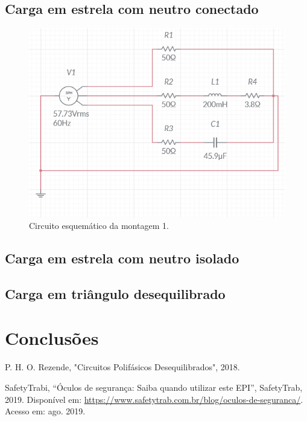 \documentclass[a4paper,12pt,oneside,openany,table,xcdraw]{article}
\begin{document}
\subsection{Carga em estrela com neutro conectado}
\begin{figure}[H]
\centering
\includegraphics[width=13.5cm]{m1-esquema}
\caption{Circuito esquemático da montagem 1.}
\label{m1:esquema}
\end{figure}

\subsection{Carga em estrela com neutro isolado}

\subsection{Carga em triângulo desequilibrado}

\section{Conclusões} %


\newpage
\begin{thebibliography}{9} 
    P. H. O. Rezende,
    "Circuitos Polifásicos Desequilibrados", 2018.

    SafetyTrabi,
    “Óculos de segurança: Saiba quando utilizar este EPI”, SafetyTrab, 2019.
 Disponível em:
 \url{https://www.safetytrab.com.br/blog/oculos-de-seguranca/}. Acesso em: ago. 2019.


\end{thebibliography}
\end{document}
